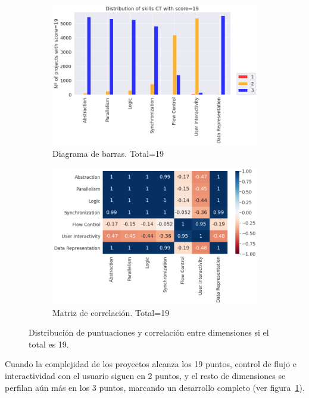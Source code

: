 \documentclass[a4paper, 12pt]{book}
\begin{document}
\begin{figure}[H]
    \centering
    \begin{subfigure}[h]{.49\textwidth} 
        \includegraphics[width=\textwidth]{img/distribucion_19_Scratch}
        \caption{Diagrama de barras. Total=19}
        \label{fig:total19}
    \end{subfigure}       
    \begin{subfigure}[h]{.49\textwidth} 
        \includegraphics[width=\textwidth]{img/corr_19_Scratch}
        \caption{Matriz de correlación. Total=19}
        \label{fig:corr19}
    \end{subfigure}
     \caption{Distribución de puntuaciones y correlación entre dimensiones si el total es 19.}
\end{figure}

Cuando la complejidad de los proyectos alcanza los 19 puntos, control de flujo e interactividad con el usuario siguen en 2 puntos, y el resto de dimensiones se perfilan aún más en los 3 puntos, marcando un desarrollo completo (ver figura~\ref{fig:total19}).
\end{document}
